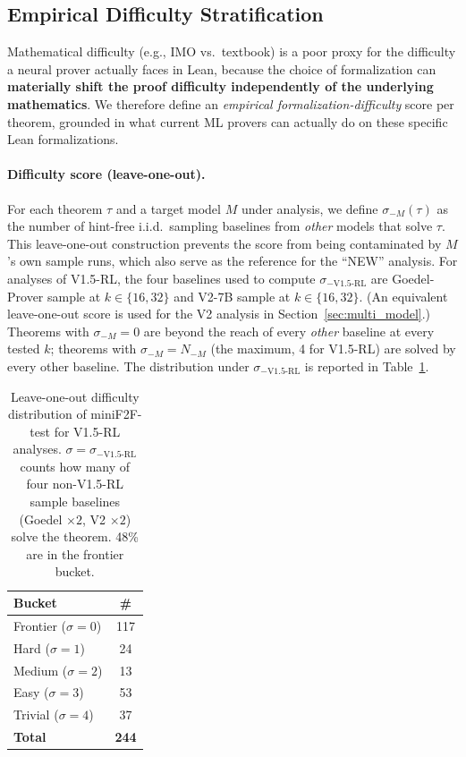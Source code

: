 \documentclass{article}
\begin{document}
\subsection{Empirical Difficulty Stratification}
\label{sec:difficulty}

Mathematical difficulty (e.g., IMO vs.\ textbook) is a poor proxy for the difficulty a neural prover actually faces in Lean, because the choice of formalization can \textbf{materially shift the proof difficulty independently of the underlying mathematics}. We therefore define an \emph{empirical formalization-difficulty} score per theorem, grounded in what current ML provers can actually do on these specific Lean formalizations.

\paragraph{Difficulty score (leave-one-out).}
For each theorem $\tau$ and a target model $M$ under analysis, we define $\sigma_{-M}(\tau)$ as the number of hint-free i.i.d.\ sampling baselines from \emph{other} models that solve $\tau$. This leave-one-out construction prevents the score from being contaminated by $M$'s own sample runs, which also serve as the reference for the ``NEW'' analysis. For analyses of V1.5-RL, the four baselines used to compute $\sigma_{-\text{V1.5-RL}}$ are Goedel-Prover sample at $k{\in}\{16,32\}$ and V2-7B sample at $k{\in}\{16,32\}$. (An equivalent leave-one-out score is used for the V2 analysis in Section~\ref{sec:multi_model}.) Theorems with $\sigma_{-M}{=}0$ are beyond the reach of every \emph{other} baseline at every tested $k$; theorems with $\sigma_{-M}{=}N_{-M}$ (the maximum, 4 for V1.5-RL) are solved by every other baseline. The distribution under $\sigma_{-\text{V1.5-RL}}$ is reported in Table~\ref{tab:difficulty_dist}.

\begin{table}[t]
\centering
\small
\begin{tabular}{lc}
\toprule
\textbf{Bucket} & \textbf{\#} \\
\midrule
Frontier ($\sigma{=}0$)  & 117 \\
Hard     ($\sigma{=}1$)  & 24  \\
Medium   ($\sigma{=}2$)  & 13  \\
Easy     ($\sigma{=}3$)  & 53  \\
Trivial  ($\sigma{=}4$)  & 37  \\
\midrule
\textbf{Total}           & \textbf{244} \\
\bottomrule
\end{tabular}
\caption{Leave-one-out difficulty distribution of miniF2F-test for V1.5-RL analyses. $\sigma = \sigma_{-\text{V1.5-RL}}$ counts how many of four non-V1.5-RL sample baselines (Goedel $\times 2$, V2 $\times 2$) solve the theorem. 48\% are in the frontier bucket.}
\label{tab:difficulty_dist}
\end{table}
\end{document}
